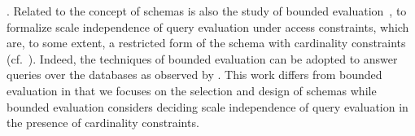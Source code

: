 {.
Related to the concept of \baav schemas is also the study of
bounded evaluation~\cite{PODS14,PODS15,SIGMOD16,PODS16}, to
formalize scale independence of query evaluation under access
constraints, which are, to some extent, a restricted form of the
\baav schema with cardinality constraints (cf.~\cite{VLDB19}).
Indeed, the techniques of bounded evaluation can be adopted to answer
queries over the \baav databases as observed by \cite{VLDB19}.
This work differs from bounded evaluation in that we focuses on
the selection and design of \baav schemas while bounded
evaluation considers deciding scale independence of query
evaluation in the presence of cardinality constraints. 
}%















